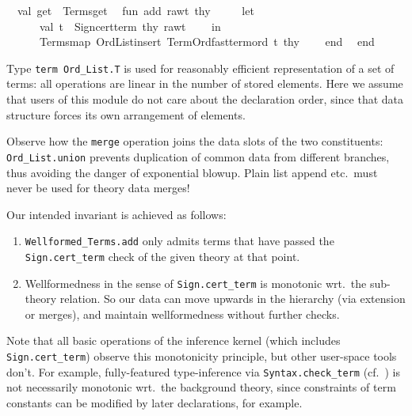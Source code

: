 \begin{isabellebody}
\isanewline
\ \ val\ get\ {\isacharequal}\ Terms{\isachardot}get{\isacharsemicolon}\isanewline
\isanewline
\ \ fun\ add\ raw{\isacharunderscore}t\ thy\ {\isacharequal}\isanewline
\ \ \ \ let\isanewline
\ \ \ \ \ \ val\ t\ {\isacharequal}\ Sign{\isachardot}cert{\isacharunderscore}term\ thy\ raw{\isacharunderscore}t{\isacharsemicolon}\isanewline
\ \ \ \ in\isanewline
\ \ \ \ \ \ Terms{\isachardot}map\ {\isacharparenleft}Ord{\isacharunderscore}List{\isachardot}insert\ Term{\isacharunderscore}Ord{\isachardot}fast{\isacharunderscore}term{\isacharunderscore}ord\ t{\isacharparenright}\ thy\isanewline
\ \ \ \ end{\isacharsemicolon}\isanewline
\isanewline
\ \ end{\isacharsemicolon}\isanewline
{\isacharverbatimclose}%
\endisatagML
{\isafoldML}%
%
\isadelimML
%
\endisadelimML
%
\begin{isamarkuptext}%
Type \verb|term Ord_List.T| is used for reasonably
  efficient representation of a set of terms: all operations are
  linear in the number of stored elements.  Here we assume that users
  of this module do not care about the declaration order, since that
  data structure forces its own arrangement of elements.

  Observe how the \verb|merge| operation joins the data slots of
  the two constituents: \verb|Ord_List.union| prevents duplication of
  common data from different branches, thus avoiding the danger of
  exponential blowup.  Plain list append etc.\ must never be used for
  theory data merges!

  \medskip Our intended invariant is achieved as follows:
  \begin{enumerate}

  \item \verb|Wellformed_Terms.add| only admits terms that have passed
  the \verb|Sign.cert_term| check of the given theory at that point.

  \item Wellformedness in the sense of \verb|Sign.cert_term| is
  monotonic wrt.\ the sub-theory relation.  So our data can move
  upwards in the hierarchy (via extension or merges), and maintain
  wellformedness without further checks.

  \end{enumerate}

  Note that all basic operations of the inference kernel (which
  includes \verb|Sign.cert_term|) observe this monotonicity principle,
  but other user-space tools don't.  For example, fully-featured
  type-inference via \verb|Syntax.check_term| (cf.\
  ) is not necessarily monotonic wrt.\ the
  background theory, since constraints of term constants can be
  modified by later declarations, for example.


\end{isamarkuptext}
\end{isabellebody}
